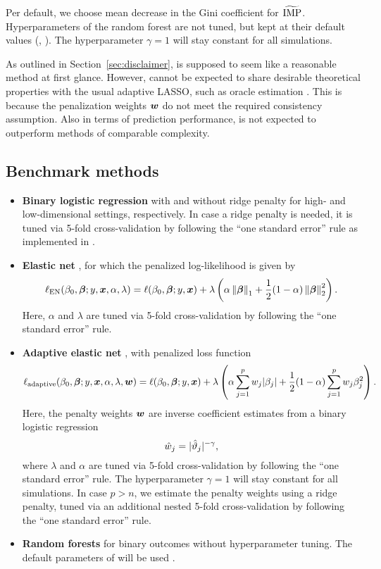 \documentclass[a4paper, 11pt]{article}\usepackage[]{graphicx}\usepackage[]{color}
\begin{document}
Per default, we choose mean decrease in the Gini coefficient for $\widetilde{\operatorname{IMP}}$.
Hyperparameters of the random forest are not tuned, but kept at their default
values (\eg {}, ). The hyperparameter $\gamma = 1$ will stay
constant for all simulations.

As outlined in Section~\ref{sec:disclaimer}, \ainet{} is supposed to seem like
a reasonable method at first glance. However, \ainet{} cannot be expected to 
share desirable theoretical properties with the usual adaptive LASSO, 
such as oracle estimation \citep{Zou2006}. This is because the penalization
weights $\text{\boldmath$w$}$ do not meet the required consistency assumption. Also in terms of prediction
performance, \ainet{} is not expected to outperform methods of comparable complexity.

\subsection{Benchmark methods}

\begin{itemize}
   \item \textbf{Binary logistic regression} \citep{mccullagh2019generalized} 
   with and without ridge penalty for high- and
   low-dimensional settings, respectively. In case a ridge penalty is needed,
   it is tuned via 5-fold cross-validation by following the ``one standard
   error'' rule as implemented in  \citep{Friedman2010}. 
   \item \textbf{Elastic net} \citep{Zou2005}, for which the penalized 
   log-likelihood is given by
    $$\ell_{\text{EN}}(\beta_0, \text{\boldmath$\beta$}; y, \text{\boldmath$x$}, \alpha, \lambda) = 
      \ell(\beta_0, \text{\boldmath$\beta$}; y, \text{\boldmath$x$}) + \lambda\left(\alpha \left\lVert\text{\boldmath$\beta$}\right\rVert_1 + \frac{1}{2} (1-\alpha) \left\lVert\text{\boldmath$\beta$}\right\rVert_2^2 \right).$$
    Here, $\alpha$ and $\lambda$ are tuned via 5-fold cross-validation by following 
    the ``one standard error'' rule.
   \item \textbf{Adaptive elastic net} \citep{Zou2006}, with penalized loss function
    $$\ell_{\text{adaptive}}(\beta_0, \text{\boldmath$\beta$}; y, \text{\boldmath$x$}, \alpha, \lambda, \text{\boldmath$w$})
    = \ell(\beta_0, \text{\boldmath$\beta$}; y, \text{\boldmath$x$}) + \lambda\left(\alpha \sum_{j = 1}^p{w_j\lvert\beta_j\rvert} + \frac{1}{2} (1-\alpha) \sum_{j=1}^p{w_j\beta_j^2} \right).$$
    Here, the penalty weights $\text{\boldmath$w$}$ are inverse coefficient estimates from a
    binary logistic regression
    $$\hat{w}_j = \lvert\hat{\vartheta}_j\rvert^{-\gamma},$$
    where $\lambda$ and $\alpha$ are tuned via 5-fold cross-validation by 
    following the ``one standard error'' rule.
    The hyperparameter $\gamma = 1$ will stay constant for all simulations.
    In case $p > n$, we estimate the penalty weights using a ridge penalty, tuned
    via an additional nested 5-fold cross-validation
    by following the ``one standard error'' rule.
    \item \textbf{Random forests} \citep{Breiman2001} for binary outcomes without 
    hyperparameter tuning. The default parameters of  will be used 
    \citep{ranger2017}. %
\end{itemize}
\end{document}
